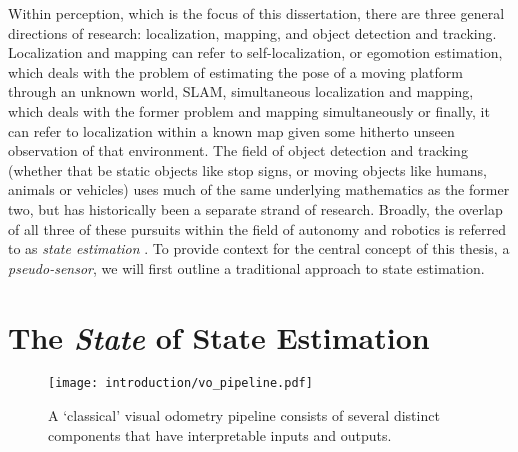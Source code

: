  Within perception, which is the focus of this dissertation, there are three general directions of research: localization, mapping, and object detection and tracking. Localization and mapping can refer to self-localization, or egomotion estimation, which deals with the problem of estimating the pose of a moving platform through an unknown world, SLAM, simultaneous localization and mapping, which deals with the former problem and mapping simultaneously or finally, it can refer to localization within a known map given some hitherto unseen observation of that environment. The field of object detection and tracking (whether that be static objects like stop signs, or moving objects like humans, animals or vehicles) uses much of the same underlying mathematics as the former two, but has historically been a separate strand of research. Broadly, the overlap of all three of these pursuits within the field of autonomy and robotics is referred to as \textit{state estimation} \citep{Barfoot2017-ri}. To provide context for the central concept of this thesis, a \textit{pseudo-sensor}, we will first outline a traditional approach to state estimation.


\section{The \textit{State} of State Estimation}

\begin{figure}
\begin{center}
		\texttt{[image: introduction/vo\_pipeline.pdf]}
		\caption{A `classical' visual odometry pipeline consists of several distinct components that have interpretable inputs and outputs.}
  	\label{fig:intro_vo_pipeline}
\end{center}
\end{figure}


